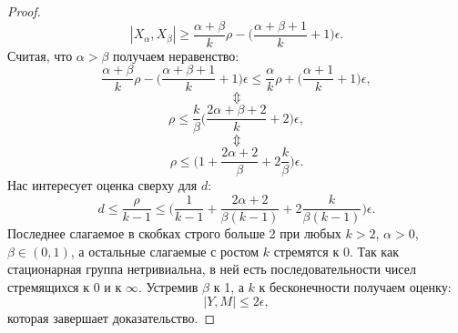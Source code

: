 \begin{proof}
	$$|X_\alpha, X_{\beta}| \ge \frac{\alpha+\beta}{k}\rho - \big(\frac{\alpha+\beta+1}{k}+1\big)\epsilon.$$
	 Считая, что $\alpha > \beta$ получаем неравенство:
	 $$\frac{\alpha+\beta}{k}\rho - \big(\frac{\alpha+\beta+1}{k}+1\big)\epsilon \le \frac{\alpha}{k}\rho + \big(\frac{\alpha+1}{k} + 1\big)\epsilon,$$
	 $$\Updownarrow$$
	 $$\rho \le \frac{k}{\beta}\bigg(\frac{2\alpha+\beta+2}{k}+2\bigg)\epsilon,$$
	 $$\Updownarrow$$
	 $$\rho \le \bigg(1+\frac{2\alpha + 2}{\beta} + 2\frac{k}{\beta}\bigg)\epsilon.$$
	Нас интересует оценка сверху для $d$:
	$$d \le \frac{\rho}{k-1} \le \bigg(\frac{1}{k-1}+\frac{2\alpha + 2}{\beta(k-1)} + 2\frac{k}{\beta(k-1)}\bigg)\epsilon. $$
	Последнее слагаемое в скобках строго больше 2 при любых $k>2$, $\alpha>0$,
$\beta\in (0,1)$, а остальные слагаемые с ростом $k$ стремятся к $0$. Так как стационарная группа нетривиальна, в ней есть последовательности чисел стремящихся к 0 и к $\infty$.
Устремив $\beta$ к 1, а $k$ к бесконечности получаем оценку:
	$$|Y, M| \le 2\epsilon,$$
которая завершает доказательство.

\end{proof}
